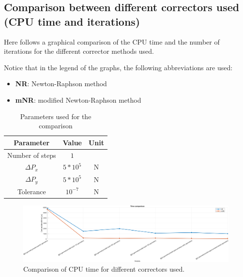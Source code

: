 \subsection{Comparison between different correctors used (CPU time and iterations)}
\label{subsec:comparison_between_different_correctors_used}

Here follows a graphical comparison of the CPU time and the number of iterations for the different corrector methods used.

Notice that in the legend of the graphs, the following abbreviations are used:

\begin{itemize}
    \item \textbf{NR}: Newton-Raphson method
    \item \textbf{mNR}: modified Newton-Raphson method
\end{itemize}

\begin{table}[H]
    \centering
    \begin{tabular}{|c|c|c|}
        \hline
        \textbf{Parameter} & \textbf{Value} & \textbf{Unit} \\ \hline
        Number of steps    & $1$            & ~             \\ \hline
        $\Delta P_x$       & $5*10^{5}$     & N             \\ \hline
        $\Delta P_y$       & $5*10^{5}$     & N             \\ \hline
        Tolerance          & $10^{-7}$      & N             \\ \hline
    \end{tabular}
    \caption{Parameters used for the comparison}
    \label{tab:parameters_for_CPU_time_and_iterations_comparison}
\end{table}

\begin{figure}[H]
    \centering
    \includegraphics[width=.9\textwidth]{img/CPU_time_comparison}
    \caption{Comparison of CPU time for different correctors used.}
    \label{fig:CPU_time_comparison}
\end{figure}

